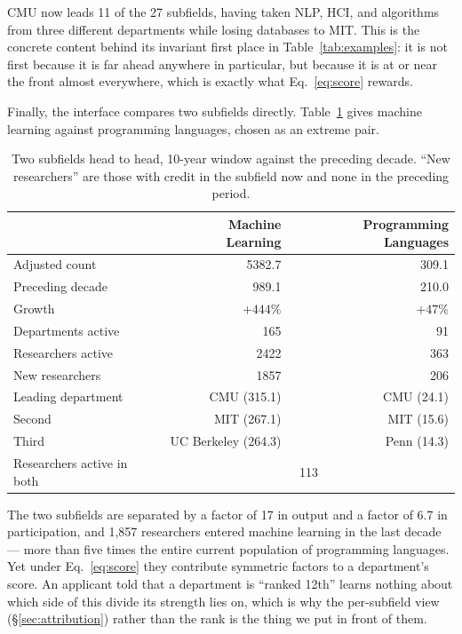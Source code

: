 \documentclass[11pt]{article}
\begin{document}
CMU now leads 11 of the 27 subfields, having taken NLP, HCI, and algorithms
from three different departments while losing databases to MIT. This is the
concrete content behind its invariant first place in
Table~\ref{tab:examples}: it is not first because it is far ahead anywhere in
particular, but because it is at or near the front almost everywhere, which is
exactly what Eq.~\ref{eq:score} rewards.

Finally, the interface compares two subfields directly.
Table~\ref{tab:fieldcompare} gives machine learning against programming
languages, chosen as an extreme pair.

\begin{table}[t]
\centering
\caption{Two subfields head to head, 10-year window against the preceding
decade. ``New researchers'' are those with credit in the subfield now and none
in the preceding period.}
\label{tab:fieldcompare}
\begin{tabular}{lrr}
\toprule
& Machine Learning & Programming Languages \\
\midrule
Adjusted count            & 5382.7 & 309.1 \\
Preceding decade          & 989.1  & 210.0 \\
Growth                    & $+444$\% & $+47$\% \\
Departments active        & 165    & 91  \\
Researchers active        & 2422   & 363 \\
New researchers           & 1857   & 206 \\
\midrule
Leading department        & CMU (315.1) & CMU (24.1) \\
Second                    & MIT (267.1) & MIT (15.6) \\
Third                     & UC Berkeley (264.3) & Penn (14.3) \\
\midrule
Researchers active in both & \multicolumn{2}{c}{113} \\
\bottomrule
\end{tabular}
\end{table}

The two subfields are separated by a factor of 17 in output and a factor of 6.7
in participation, and 1{,}857 researchers entered machine learning in the last
decade --- more than five times the entire current population of programming
languages. Yet under Eq.~\ref{eq:score} they contribute symmetric factors to a
department's score. An applicant told that a department is ``ranked 12th''
learns nothing about which side of this divide its strength lies on, which is
why the per-subfield view (\S\ref{sec:attribution}) rather than the rank is the
thing we put in front of them.
\end{document}
